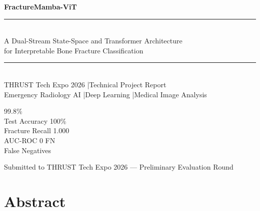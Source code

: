 \documentclass[12pt, a4paper]{article}
\begin{document}
\thispagestyle{empty}
\pagecolor{NavyBlue}
\color{white}

\vspace*{3.5cm}

\begin{center}
  {\fontsize{30}{36}\selectfont\bfseries FractureMamba-ViT}\\[0.5em]
  \textcolor{TealBlue}{\rule{0.6\linewidth}{1.5pt}}\\[0.8em]
  {\large A Dual-Stream State-Space and Transformer Architecture\\[0.3em]
   for Interpretable Bone Fracture Classification}\\[1.2em]
  \textcolor{AccentCyan}{\rule{0.4\linewidth}{0.6pt}}\\[0.8em]
  {\normalsize THRUST Tech Expo 2026 \quad|\quad Technical Project Report}\\[0.3em]
  {\small Emergency Radiology AI \quad|\quad Deep Learning \quad|\quad Medical Image Analysis}
\end{center}

\vspace{1.8cm}

\begin{tcbitemize}[
  raster columns=4,
  raster equal height,
  colback=NavyBlue!70!black,
  colframe=TealBlue,
  boxrule=0.8pt,
  arc=4pt,
  fontupper=\bfseries\color{AccentCyan}\centering,
  halign=center,
  valign=center,
  size=normal
]
  \tcbitem \large 99.8\%\\[2pt]\normalsize Test Accuracy
  \tcbitem \large 100\%\\[2pt]\normalsize Fracture Recall
  \tcbitem \large 1.000\\[2pt]\normalsize AUC-ROC
  \tcbitem \large 0 FN\\[2pt]\normalsize False Negatives
\end{tcbitemize}

\vfill
\begin{center}
  \textcolor{MidGray}{\small Submitted to THRUST Tech Expo 2026 — Preliminary Evaluation Round}
\end{center}

\newpage
\pagecolor{white}
\color{BodyText}
\setcounter{page}{1}

\section{Abstract}
\end{document}
